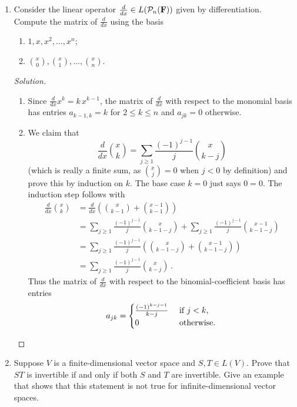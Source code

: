 \documentclass[11pt]{amsart}
\begin{document}
\begin{enumerate}[(1)]
\item Consider the linear operator $\frac{d}{dx} \in L(\mathcal{P}_n(\mathbf{F}))$ given by differentiation. Compute the matrix of $\frac{d}{dx}$ using the basis
  \begin{enumerate}
  \item $1, x, x^2, \dots, x^n$;
  \item $\binom x 0, \binom x 1, \dots, \binom x n$.
  \end{enumerate}

\begin{proof}[Solution]
\begin{enumerate}

\item Since $\frac{d}{dx} x^k = k \, x^{ k-1 }$, the matrix of $\frac{d}{dx}$ with respect to the monomial basis has entries $a_{ k-1, k } = k$ for $2 \le k \le n$ and $a_{ jk } = 0$ otherwise.

\item We claim that
\[
  \frac{ d }{ dx } \binom x k = \sum_{ j \ge 1 } \frac{ (-1)^{ j-1 } }{ j } \binom{ x }{ k-j } 
\]
(which is really a finite sum, as $\binom x j = 0$ when $j<0$ by definition)
and prove this by induction on $k$.
The base case $k=0$ just says $0=0$.
The induction step follows with
\begin{align*}
  \frac{ d }{ dx } \binom x k
  &= \frac{ d }{ dx } \left( \binom{ x }{ k-1 } + \binom{ x-1 }{ k-1 } \right) \\
  &= \sum_{ j \ge 1 } \frac{ (-1)^{ j-1 } }{ j } \binom{ x }{ k-1-j } + \sum_{ j \ge 1 } \frac{ (-1)^{ j-1 } }{ j } \binom{ x-1 }{ k-1-j } \\
  &= \sum_{ j \ge 1 } \frac{ (-1)^{ j-1 } }{ j } \left( \binom{ x }{ k-1-j } + \binom{ x-1 }{ k-1-j } \right) \\
  &= \sum_{ j \ge 1 } \frac{ (-1)^{ j-1 } }{ j } \binom{ x }{ k-j } \, .
\end{align*}
Thus the matrix of $\frac{ d }{ dx }$ with respect to the binomial-coefficient basis has entries
\[
  a_{ jk } = \begin{cases}
    \frac{ (-1)^{ k-j-1 } }{ k-j } & \text{ if } j<k, \\
    0 & \text{ otherwise.}
  \end{cases} \qedhere
\]
\end{enumerate}
\end{proof}

\item Suppose $V$ is a finite-dimensional vector space and $S, T \in L(V )$.
Prove that $ST$ is invertible if and only if both $S$ and $T$ are invertible.
Give an example that shows that this statement is not true for infinite-dimensional vector spaces.


\end{enumerate}
\end{document}
